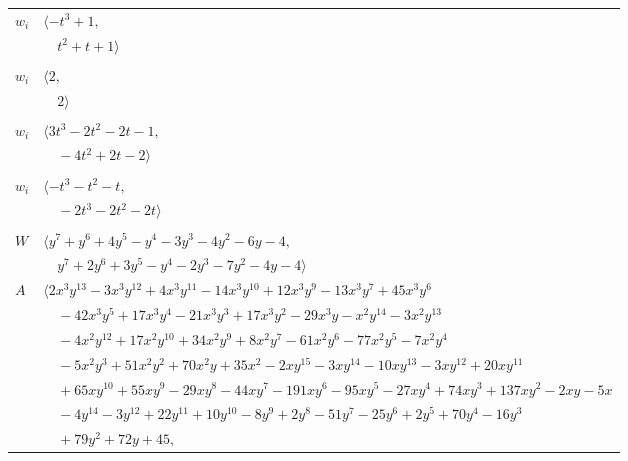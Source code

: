 \documentclass[11pt]{article}
\begin{document}
\begin{longtable}{@{}ll@{}}
$w_i$ & $\langle -t^{3}+1,$\\
 & $\quad t^{2}+t+1\rangle$\\
\addlinespace[2pt]
\multicolumn{2}{@{}p{0.97\textwidth}@{}}{$i=14$, $D_i=1$, $\rho_{ij}$: $2{:}1, \allowbreak 4{:}1, \allowbreak 9{:}1, \allowbreak 15{:}1$}\\
$w_i$ & $\langle 2,$\\
 & $\quad 2\rangle$\\
\addlinespace[2pt]
\multicolumn{2}{@{}p{0.97\textwidth}@{}}{$i=15$, $D_i=1$, $\rho_{ij}$: $1{:}1, \allowbreak 9{:}1, \allowbreak 12{:}1, \allowbreak 13{:}2, \allowbreak 14{:}2, \allowbreak 17{:}1, \allowbreak 18{:}2$}\\
$w_i$ & $\langle 3t^{3}-2t^{2}-2t-1,$\\
 & $\quad -4t^{2}+2t-2\rangle$\\
\addlinespace[2pt]
\multicolumn{2}{@{}p{0.97\textwidth}@{}}{$i=16$, $D_i=1$, $\rho_{ij}$: $0{:}2, \allowbreak 3{:}2, \allowbreak 8{:}1, \allowbreak 11{:}1, \allowbreak 19{:}1$}\\
$w_i$ & $\langle -t^{3}-t^{2}-t,$\\
 & $\quad -2t^{3}-2t^{2}-2t\rangle$\\
\addlinespace[2pt]
\multicolumn{2}{@{}p{0.97\textwidth}@{}}{$i=17$, $D_i=1$, $\rho_{ij}$: $0{:}1, \allowbreak 1{:}1, \allowbreak 7{:}2, \allowbreak 8{:}1, \allowbreak 10{:}1, \allowbreak 15{:}2$}\\
$W$ & $\langle y^{7}+y^{6}+4y^{5}-y^{4}-3y^{3}-4y^{2}-6y-4,$\\
 & $\quad y^{7}+2y^{6}+3y^{5}-y^{4}-2y^{3}-7y^{2}-4y-4\rangle$\\
$A$ & $\langle 2x^{3}y^{13}-3x^{3}y^{12}+4x^{3}y^{11}-14x^{3}y^{10}+12x^{3}y^{9}-13x^{3}y^{7}+45x^{3}y^{6}$\\
 & $\quad -42x^{3}y^{5}+17x^{3}y^{4}-21x^{3}y^{3}+17x^{3}y^{2}-29x^{3}y-x^{2}y^{14}-3x^{2}y^{13}$\\
 & $\quad -4x^{2}y^{12}+17x^{2}y^{10}+34x^{2}y^{9}+8x^{2}y^{7}-61x^{2}y^{6}-77x^{2}y^{5}-7x^{2}y^{4}$\\
 & $\quad -5x^{2}y^{3}+51x^{2}y^{2}+70x^{2}y+35x^{2}-2xy^{15}-3xy^{14}-10xy^{13}-3xy^{12}+20xy^{11}$\\
 & $\quad +65xy^{10}+55xy^{9}-29xy^{8}-44xy^{7}-191xy^{6}-95xy^{5}-27xy^{4}+74xy^{3}+137xy^{2}-2xy-5x$\\
 & $\quad -4y^{14}-3y^{12}+22y^{11}+10y^{10}-8y^{9}+2y^{8}-51y^{7}-25y^{6}+2y^{5}+70y^{4}-16y^{3}$\\
 & $\quad +79y^{2}+72y+45,$\\

\end{longtable}
\end{document}
